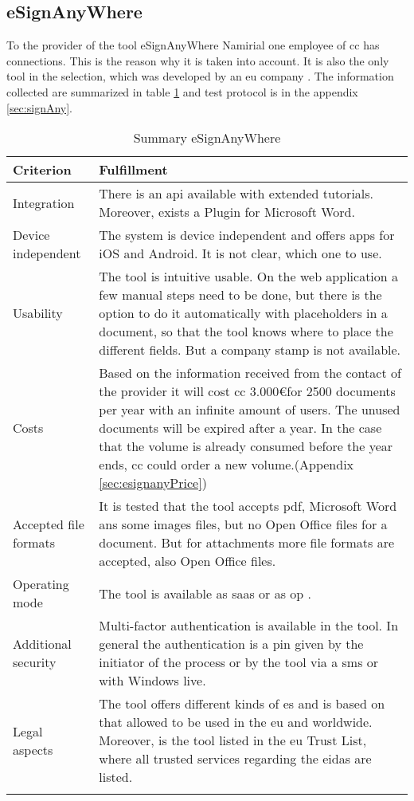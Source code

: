 \subsection{eSignAnyWhere}
To the provider of the tool eSignAnyWhere Namirial one employee of \gls{cc} has connections. This is the reason why it is taken into account. It is also the only tool in the selection, which was developed by an \gls{eu} company \parencite{signAny2018contact}. The information collected are summarized in table \ref{tab:esignany} and test protocol is in the appendix \ref{sec:signAny}.
	\begin{longtable}{|p{4cm}|p{10cm}|} \hline
		Criterion & Fulfillment \\ \hline
		Integration & There is an \gls{api} available with extended tutorials. Moreover, exists a Plugin for Microsoft Word. \parencite{signAny2018api, signAny2018dev,signAny2018guide} \\ \hline
		Device independent & The system is device independent and offers \glspl{app} for iOS and Android. It is not clear, which one to use. \parencite{signAny2018info} \\ \hline
		Usability & The tool is intuitive usable. On the web application a few manual steps need to be done, but there is the option to do it automatically with placeholders in a document, so that the tool knows where to place the different fields. But a company stamp is not available. \parencite{signAny2018guide} \\ \hline
		Costs & Based on the information received from the contact of the provider it will cost \gls{cc} 3.000\euro for 2500 documents per year with an infinite amount of users. The unused documents will be expired after a year. In the case that the volume is already consumed before the year ends, \gls{cc} could order a new volume.(Appendix \ref{sec:esignanyPrice}) \\ \hline
		Accepted file formats & It is tested that the tool accepts \gls{pdf}, Microsoft Word ans some images files, but no Open Office files for a document. But for attachments more file formats are accepted, also Open Office files. \\ \hline
		Operating mode &  The tool is available as \gls{saas} or as \gls{op} \parencite{signAny2018business}. \\ \hline
		Additional security & Multi-factor authentication is available in the tool. In general the authentication is a pin given by the initiator of the process or by the tool via a \gls{sms} or with Windows live. \parencite{signAny2018sign} \\ \hline
		Legal aspects & The tool offers different kinds of \gls{es} and is based on that allowed to be used in the \gls{eu} and worldwide. Moreover, is the tool listed in the \gls{eu} Trust List, where all trusted services regarding the \gls{eidas} are listed. \parencite{signAny2018sign,signAny2018trust} \\ \hline
	\caption{Summary eSignAnyWhere}
	\label{tab:esignany}
	\end{longtable}
